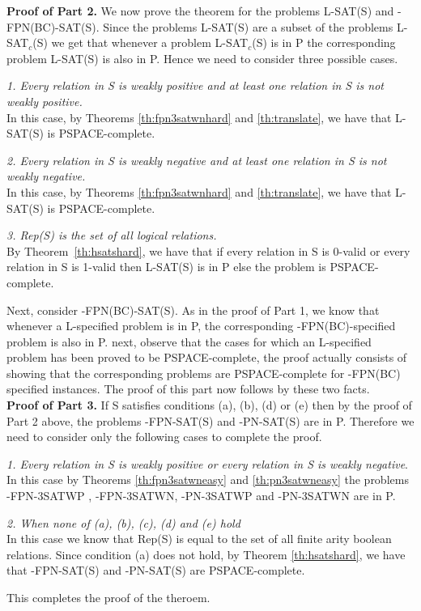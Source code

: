 \noindent
{\bf Proof of Part 2.}
We now prove the theorem for the problems {\sf L-SAT(S)} and
{-FPN(BC)-SAT(S)}.  Since the problems
{\sf L-SAT(S)} are a subset of the problems {\sf L-SAT$_c$(S)} 
we get that whenever a problem {\sf L-SAT$_c$(S)} is  in 
P the corresponding problem {\sf L-SAT(S)} is also
in {\sf P}. Hence we need to consider three possible cases.

\noindent
{\em 1.  Every relation in {\sf S} is weakly positive and at least one relation
in {\sf S} is not weakly positive.}\\
In this case, by Theorems \ref{th:fpn3satwnhard} and \ref{th:translate}, 
we have that {\sf L-SAT(S)} is {\sf PSPACE}-complete.

\noindent
{\em 2. Every relation in {\sf S} is weakly negative and at least one relation
in {\sf S} is not weakly negative.}\\
In this case, by Theorems \ref{th:fpn3satwnhard} and \ref{th:translate}, 
we have that {\sf L-SAT(S)} is
{\sf PSPACE}-complete.

\noindent
{\em  3. {\sf Rep(S)}  is the set of all logical relations.}\\
By Theorem~\ref{th:hsatshard}, we have that if 
every relation in {\sf S} is 0-valid or every relation 
in {\sf S} is 1-valid then {\sf L-SAT(S)} is in {\sf P}
else the problem is {\sf PSPACE}-complete.



Next, consider {-FPN(BC)-SAT(S)}. 
As in the proof of Part 1, we know that whenever a {\sf L}-specified
problem is in {\sf P}, 
the corresponding {-FPN(BC)}-specified problem is also in {\sf P}.
next, observe that the cases for which an {\sf L}-specified problem has been
proved to be {\sf PSPACE}-complete, the proof actually consists of showing that
the corresponding problems are {\sf PSPACE}-complete for {-FPN(BC)} 
specified instances. The proof of this part now follows by these two facts.\\


\noindent
{\bf Proof of Part 3.}
If {\sf S} satisfies conditions (a), (b), (d) or (e) then 
by the proof of Part 2 above, the problems
{-FPN-SAT(S)} and {-PN-SAT(S)} are in {\sf P}. 
Therefore we need to consider only the following cases to complete the proof.


\noindent
{\em 1. Every relation in {\sf S} is weakly positive or every relation in
{\sf S} is weakly negative}.\\
In this case by Theorems \ref{th:fpn3satwneasy} and \ref{th:pn3satwneasy}
the problems {-FPN-3SATWP} , {-FPN-3SATWN}, {-PN-3SATWP}  and
{-PN-3SATWN}  are in {\sf P}.

\noindent
{\em 2. When none of (a), (b), (c), (d) and (e) hold}\\
In this case we know that {\sf Rep(S)} is equal to the set
of all finite arity boolean relations. Since condition (a) does not hold,
by Theorem \ref{th:hsatshard}, we have that 
{-FPN-SAT(S)} and {-PN-SAT(S)} are {\sf PSPACE}-complete.

This completes the proof of the theroem.\QED
